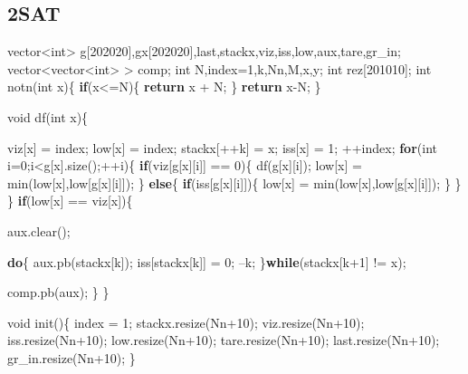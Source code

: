 \documentclass[10pt,]{article}
\newenvironment{Shaded}{}{}
\newcommand{\KeywordTok}[1]{\textcolor[rgb]{0.00,0.44,0.13}{\textbf{{#1}}}}
\newcommand{\DataTypeTok}[1]{\textcolor[rgb]{0.56,0.13,0.00}{{#1}}}
\newcommand{\DecValTok}[1]{\textcolor[rgb]{0.25,0.63,0.44}{{#1}}}
\newcommand{\NormalTok}[1]{{#1}}
\begin{document}
\subsection{2SAT}

\begin{Shaded}
\begin{Highlighting}[]
\NormalTok{vector<}\DataTypeTok{int}\NormalTok{> g[}\DecValTok{202020}\NormalTok{],gx[}\DecValTok{202020}\NormalTok{],last,stackx,viz,iss,low,aux,tare,gr_in;}
\NormalTok{vector<vector<}\DataTypeTok{int}\NormalTok{> > comp;}
\DataTypeTok{int} \NormalTok{N,index=}\DecValTok{1}\NormalTok{,k,Nn,M,x,y;}
\DataTypeTok{int} \NormalTok{rez[}\DecValTok{201010}\NormalTok{];}
\DataTypeTok{int} \NormalTok{notn(}\DataTypeTok{int} \NormalTok{x)\{}
    \KeywordTok{if}\NormalTok{(x<=N)\{}
        \KeywordTok{return} \NormalTok{x + N;}
    \NormalTok{\}}
    \KeywordTok{return} \NormalTok{x-N;}
\NormalTok{\}}

\DataTypeTok{void} \NormalTok{df(}\DataTypeTok{int} \NormalTok{x)\{}

    \NormalTok{viz[x] = index;}
    \NormalTok{low[x] = index;}
    \NormalTok{stackx[++k] = x;}
    \NormalTok{iss[x] = }\DecValTok{1}\NormalTok{;}
    \NormalTok{++index;}
    \KeywordTok{for}\NormalTok{(}\DataTypeTok{int} \NormalTok{i=}\DecValTok{0}\NormalTok{;i<g[x].size();++i)\{}
        \KeywordTok{if}\NormalTok{(viz[g[x][i]] == }\DecValTok{0}\NormalTok{)\{}
            \NormalTok{df(g[x][i]);}
            \NormalTok{low[x] = min(low[x],low[g[x][i]]);}
        \NormalTok{\}}
        \KeywordTok{else}\NormalTok{\{}
            \KeywordTok{if}\NormalTok{(iss[g[x][i]])\{}
                \NormalTok{low[x] = min(low[x],low[g[x][i]]);}
            \NormalTok{\}}
        \NormalTok{\}}
    \NormalTok{\}}
    \KeywordTok{if}\NormalTok{(low[x] == viz[x])\{}

        \NormalTok{aux.clear();}

        \KeywordTok{do}\NormalTok{\{}
            \NormalTok{aux.pb(stackx[k]);}
            \NormalTok{iss[stackx[k]] = }\DecValTok{0}\NormalTok{;}
            \NormalTok{--k;}
        \NormalTok{\}}\KeywordTok{while}\NormalTok{(stackx[k}\DecValTok{+1}\NormalTok{] != x);}

        \NormalTok{comp.pb(aux);}
    \NormalTok{\}}
\NormalTok{\}}

\DataTypeTok{void} \NormalTok{init()\{}
    \NormalTok{index = }\DecValTok{1}\NormalTok{;}
    \NormalTok{stackx.resize(Nn}\DecValTok{+10}\NormalTok{);}
    \NormalTok{viz.resize(Nn}\DecValTok{+10}\NormalTok{);}
    \NormalTok{iss.resize(Nn}\DecValTok{+10}\NormalTok{);}
    \NormalTok{low.resize(Nn}\DecValTok{+10}\NormalTok{);}
    \NormalTok{tare.resize(Nn}\DecValTok{+10}\NormalTok{);}
    \NormalTok{last.resize(Nn}\DecValTok{+10}\NormalTok{);}
    \NormalTok{gr_in.resize(Nn}\DecValTok{+10}\NormalTok{);}
\NormalTok{\}}


\end{Highlighting}
\end{Shaded}
\end{document}
